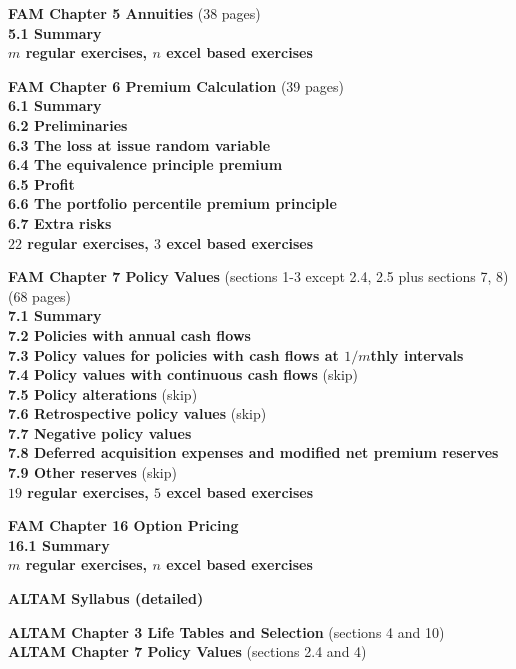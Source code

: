 \documentclass[hidelinks, 12pt]{article}
\theoremstyle{mydefstyle}
\theoremstyle{mythmstyle}
\begin{document}
\textbf{FAM Chapter 5 Annuities} (38 pages) \\
\textbf{5.1 Summary} \\
\textbf{$m$ regular exercises, $n$ excel based exercises}

\textbf{FAM Chapter 6 Premium Calculation} (39 pages) \\
\textbf{6.1 Summary} \\
\textbf{6.2 Preliminaries} \\
\textbf{6.3 The loss at issue random variable} \\
\textbf{6.4 The equivalence principle premium} \\
\textbf{6.5 Profit} \\
\textbf{6.6 The portfolio percentile premium principle} \\
\textbf{6.7 Extra risks} \\
\textbf{$22$ regular exercises, $3$ excel based exercises}

\textbf{FAM Chapter 7 Policy Values} (sections 1-3 except 2.4, 2.5 plus sections 7, 8) (68 pages) \\
\textbf{7.1 Summary} \\
\textbf{7.2 Policies with annual cash flows} \\
\textbf{7.3 Policy values for policies with cash flows at $1/m$thly intervals} \\
\textbf{7.4 Policy values with continuous cash flows} (skip) \\
\textbf{7.5 Policy alterations} (skip) \\
\textbf{7.6 Retrospective policy values} (skip) \\
\textbf{7.7 Negative policy values} \\
\textbf{7.8 Deferred acquisition expenses and modified net premium reserves} \\
\textbf{7.9 Other reserves} (skip) \\
\textbf{$19$ regular exercises, $5$ excel based exercises}

\textbf{FAM Chapter 16 Option Pricing} \\
\textbf{16.1 Summary} \\
\textbf{$m$ regular exercises, $n$ excel based exercises}

\newpage

\begin{center}
\textbf{ALTAM Syllabus (detailed)}
\end{center}

\textbf{ALTAM Chapter 3 Life Tables and Selection} (sections 4 and 10) \\
\textbf{ALTAM Chapter 7 Policy Values} (sections 2.4 and 4)
\end{document}
